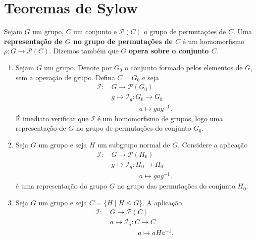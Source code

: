 

\section{Teoremas de Sylow} %
\label{sec:teoremas_de_sylow}

\begin{definicao}
	Sejam $G$ um grupo, $C$ um conjunto e $\mathcal{P}(C)$ o grupo de permuta\c{c}\~oes de $C$. Uma \textbf{representa\c{c}\~ao de $G$ no grupo de permuta\c{c}\~oes de $C$} \'e um homomorfismo $\rho : G \to \mathcal{P}(C)$. Dizemos tamb\'em que $G$ \textbf{opera sobre o conjunto $C$}.
\end{definicao}

\begin{exemplos}
	\begin{enumerate}
		\item Sejam $G$ um grupo. Denote por $G_0$ o conjunto formado pelos elementos de $G$, sem a opera\c{c}\~ao de grupo. Defina $C = G_0$ e seja
		\begin{align*}
			\mathcal{I} :\ &G \to \mathcal{P}(G_0)\\
			&g \mapsto \mathcal{I}_g : G_0 \to G_0\\
			& \qquad \qquad a \mapsto gag^{-1}.
		\end{align*}
		\'E imediato verificar que $\mathcal{I}$ \'e um homomorfismo de grupos, logo uma representa\c{c}\~ao de $G$ no grupo de permuta\c{c}\~oes do conjunto $G_0$.

		\item Seja $G$ um grupo e seja $H$ um subgrupo normal de $G$. Considere a aplica\c{c}\~ao
		\begin{align*}
			\mathcal{I} :\ &G \to \mathcal{P}(H_0)\\
			&g \mapsto \mathcal{I}_g : H_0 \to H_0\\
			& \qquad \qquad a \mapsto gag^{-1}.
		\end{align*}
		\'e uma representa\c{c}\~ao do grupo $G$ no grupo das permuta\c{c}\~oes do conjunto $H_0$.

		\item Seja $G$ um grupo e seja $C = \{H \mid H \le G\}$. A aplica\c{c}\~ao
		\begin{align*}
			\mathcal{I} :\ &G \to \mathcal{P}(C)\\
			&a \mapsto \mathcal{I}_a : C \to C\\
			& \qquad \qquad a \mapsto aHa^{-1}.
		\end{align*}
	\end{enumerate}
\end{exemplos}

